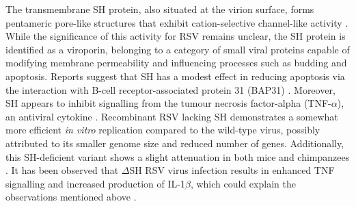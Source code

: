 The transmembrane SH protein, also situated at the virion surface, forms pentameric pore-like structures that exhibit cation-selective channel-like activity \cite{Carter2010DirectPermeability, Gan2012TheChannels}. While the significance of this activity for RSV remains unclear, the SH protein is identified as a viroporin, belonging to a category of small viral proteins capable of modifying membrane permeability and influencing processes such as budding and apoptosis. Reports suggest that SH has a modest effect in reducing apoptosis via the interaction with B-cell receptor-associated protein 31 (BAP31) \cite{Fuentes2007FunctionProtein}. Moreover, SH appears to inhibit signalling from the tumour necrosis factor-alpha (TNF-\(\alpha\)), an antiviral cytokine \cite{Fuentes2007FunctionProtein}. Recombinant RSV lacking SH demonstrates a somewhat more efficient \textit{in vitro} replication compared to the wild-type virus, possibly attributed to its smaller genome size and reduced number of genes. Additionally, this SH-deficient variant shows a slight attenuation in both mice and chimpanzees \cite{Whitehead1999RecombinantChimpanzees}. It has been observed that \(\Delta\)SH RSV virus infection results in enhanced TNF signalling and increased production of IL-1\(\beta\), which could explain the observations mentioned above \cite{Pollock2017ModulationProtein}. 

